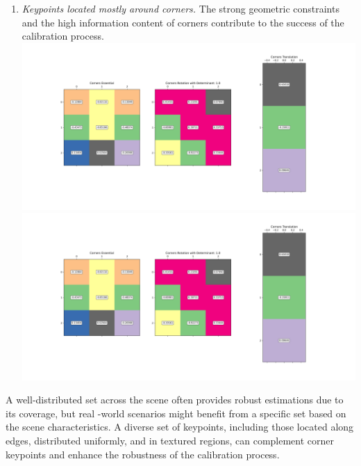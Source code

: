 \documentclass[11pt]{article}
\begin{document}
\begin{itemize}
\begin{enumerate}
            \item \textit{Keypoints located mostly around corners.}\newline
            The strong geometric constraints and the high information content of corners contribute to the success of
            the calibration process.\newline
            \includegraphics[width=\textwidth]{Output Pictures/Corners Lines}\newline
            \includegraphics[width=\textwidth]{Output Pictures/Corners Matrices}\newline
        \end{enumerate}
        A well-distributed set across the scene often provides robust estimations due to its coverage, but real
        -world scenarios might benefit from a specific set based on the scene characteristics. A diverse set of
        keypoints, including those located along edges, distributed uniformly, and in textured regions, can complement
        corner keypoints and enhance the robustness of the calibration process.\newline


\end{itemize}
\end{document}
